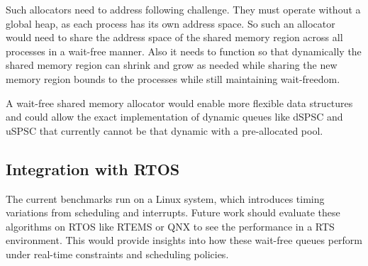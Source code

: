 Such allocators need to address following challenge. They must operate without a global heap, as each process has its own address space. So such an allocator would need to share the address space of the shared memory region across all processes in a wait-free manner. Also it needs to function so that dynamically the shared memory region can shrink and grow as needed while sharing the new memory region bounds to the processes while still maintaining wait-freedom.

A wait-free shared memory allocator would enable more flexible data structures and could allow the exact implementation of dynamic queues like \ac{dSPSC} and \ac{uSPSC} that currently cannot be that dynamic with a pre-allocated pool.

\subsection{Integration with \acf{RTOS}}
The current benchmarks run on a Linux system, which introduces timing variations from scheduling and interrupts. Future work should evaluate these algorithms on \ac{RTOS} like RTEMS or QNX to see the performance in a \ac{RTS} environment. This would provide insights into how these wait-free queues perform under real-time constraints and scheduling policies.
